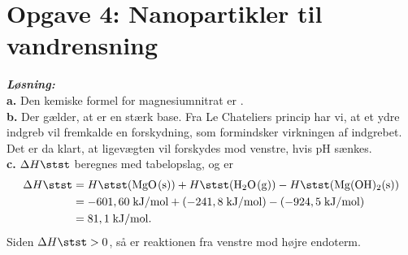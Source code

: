 \documentclass{report}
\newcommand{\sol}{\setlength{\parindent}{0cm}\textbf{\textit{Løsning:}}\setlength{\parindent}{1cm}}
\begin{document}
\section*{Opgave 4: Nanopartikler til vandrensning}
\sol \\
\textbf{a.}
Den kemiske formel for magnesiumnitrat er .\\[1ex]
\textbf{b.}
Der gælder, at  er en stærk base.
Fra Le Chateliers princip har vi, at et ydre indgreb vil fremkalde en forskydning, som formindsker virkningen af indgrebet.
Det er da klart, at ligevægten vil forskydes mod venstre, hvis pH sænkes.\\[1ex]
\textbf{c.}
$\Delta H \stst $ beregnes med tabelopslag, og er
\begin{equation*}
\begin{split}
  \Delta H \stst &=H \stst (\ce{MgO(s)}) + H \stst (\ce{H2O(g)})-H \stst (\ce{Mg(OH)2(s)})\\
  &=-601,60 \;\unit{kJ/mol} + (-241,8 \;\unit{kJ/mol}) -(-924,5 \;\unit{kJ/mol} )\\
  &=81,1 \;\unit{kJ/mol}.
\end{split}
\end{equation*}
Siden $\Delta H \stst >0$, så er reaktionen fra venstre mod højre endoterm.
\end{document}
